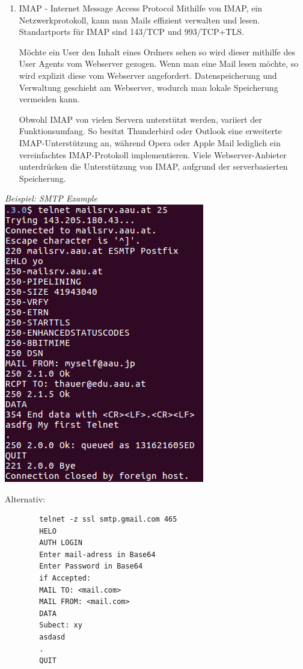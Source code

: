 \documentclass[11pt]{article}
\begin{document}
\begin{enumerate}[\thesection .1]
\begin{enumerate}[$\diamond$]
        \item IMAP - Internet Message Access Protocol
        Mithilfe von IMAP, ein Netzwerkprotokoll, kann man Mails effizient verwalten und lesen.
        Standartports für IMAP sind 143/TCP und 993/TCP+TLS.

        Möchte ein User den Inhalt eines Ordners sehen so wird dieser mithilfe des User Agents vom Webserver gezogen.
        Wenn man eine Mail lesen möchte, so wird explizit diese vom Webserver angefordert.
        Datenspeicherung und Verwaltung geschieht am Webserver, wodurch man lokale Speicherung vermeiden kann.

        Obwohl IMAP von vielen Servern unterstützt werden, variiert der Funktionsumfang.
        So besitzt Thunderbird oder Outlook eine erweiterte IMAP-Unterstützung an,
        während Opera oder Apple Mail lediglich ein vereinfachtes IMAP-Protokoll implementieren.
        Viele Webserver-Anbieter unterdrücken die Unterstützung von IMAP, aufgrund der serverbasierten Speicherung.\\
    \end{enumerate}
    \emph{Beispiel: SMTP Example}\\
    \includegraphics[height=\pagetotal]{TelnetSample.png}

    Alternativ:
    \begin{verbatim}
        telnet -z ssl smtp.gmail.com 465
        HELO
        AUTH LOGIN
        Enter mail-adress in Base64
        Enter Password in Base64
        if Accepted:
        MAIL TO: <mail.com>
        MAIL FROM: <mail.com>
        DATA
        Subect: xy
        asdasd
        .
        QUIT
    \end{verbatim}


\end{enumerate}
\end{document}
